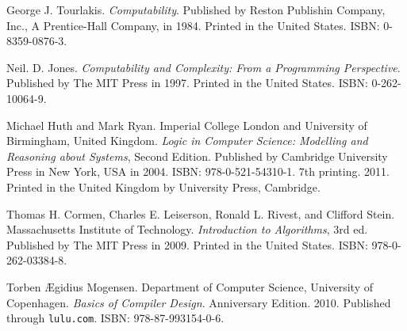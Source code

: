 \begin{thebibliography}{9}
\backrefprint


George J. Tourlakis. \emph{Computability}. Published by Reston Publishin
Company, Inc., A Prentice-Hall Company, in 1984. Printed in the United States.
ISBN: 0-8359-0876-3.

\backrefprint


Neil. D. Jones. \emph{Computability and Complexity: From a Programming
Perspective}. Published by The MIT Press in 1997.  Printed in the United
States. ISBN: 0-262-10064-9.

\backrefprint





Michael Huth and Mark Ryan. Imperial College London and University of
Birmingham, United Kingdom. \emph{Logic in Computer Science: Modelling and
Reasoning about Systems}, Second Edition. Published by Cambridge University
Press in New York, USA in 2004. ISBN: 978-0-521-54310-1. 7th printing.  2011.
Printed in the United Kingdom by University Press, Cambridge.

\backrefprint


Thomas H. Cormen, Charles E. Leiserson, Ronald L. Rivest, and Clifford Stein.
Massachusetts Institute of Technology.  \emph{Introduction to Algorithms}, 3rd
ed. Published by The MIT Press in 2009. Printed in the United States. ISBN:
978-0-262-03384-8.

\backrefprint


Torben Ægidius Mogensen. Department of Computer Science, University of
Copenhagen. \emph{Basics of Compiler Design}. Anniversary Edition. 2010.
Published through \texttt{lulu.com}. ISBN: 978-87-993154-0-6.

\backrefprint



\end{thebibliography}
